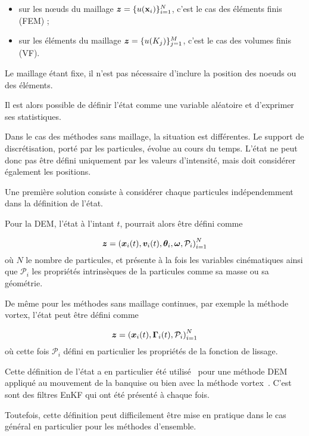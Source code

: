\begin{itemize}
    \item sur les nœuds du maillage $\bm z = \{ u(\mathbf{x}_i) \}_{i=1}^{N}$, c'est le cas des éléments finis (FEM) ;
    \item  sur les éléments du maillage $\bm z = \{ u(K_j) \}_{j=1}^{M}$, c'est le cas des volumes finis (VF).
\end{itemize}

Le maillage étant fixe, il n'est pas nécessaire d'inclure la position des noeuds ou des éléments.

Il est alors possible de définir l'état comme une variable aléatoire et d'exprimer ses statistiques.

Dans le cas des méthodes sans maillage, la situation est différentes. Le support de discrétisation, porté par les particules, évolue au cours du temps. L'état ne peut donc pas être défini uniquement par les valeurs d'intensité, mais doit considérer également les positions.

Une première solution consiste à considérer chaque particules indépendemment dans la définition de l'état.

Pour la DEM, l'état à l'intant $t$, pourrait alors être défini comme

\begin{equation*}
    \bm z = {(\bm{x}_i(t), \bm v_i(t), \bm \theta_i, \bm \omega, \mathcal P_i)}_{i=1}^N
\end{equation*}où $N$ le nombre de particules, et présente à la fois les variables cinématiques ainsi que $\mathcal P_i$ les propriétés intrinsèques de la particules comme sa masse ou sa géométrie.

De même pour les méthodes sans maillage continues, par exemple la méthode vortex, l'état peut être défini comme

\begin{equation*}
    \bm z = {(\bm{x}_i(t),\bm \Gamma_i(t), \mathcal P_i)}_{i=1}^N
\end{equation*}où cette fois $\mathcal P_i$ défini en particulier les propriétés de la fonction de lissage.

Cette définition de l'état a en particulier été utilisé~\cite{chen_superfloe_2022} pour une méthode DEM appliqué au mouvement de la banquise ou bien avec la méthode vortex~\cite{darakananda_data-assimilated_2018,le_provost_ensemble_2021}. C'est sont des filtres EnKF qui ont été présenté à chaque fois.

Toutefois, cette définition peut difficilement être mise en pratique dans le cas général en particulier pour les méthodes d'ensemble.

